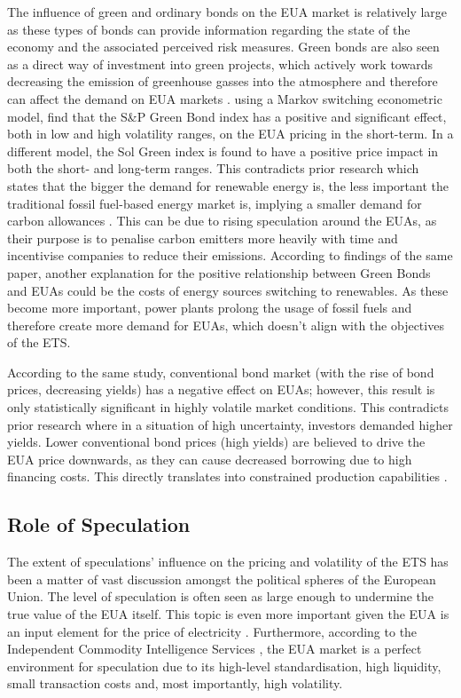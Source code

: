 \documentclass[12pt, letterpaper]{article}
\begin{document}
The influence of green and ordinary bonds on the EUA market is relatively large as these types of bonds can provide information regarding the state of the economy and the associated perceived risk measures. Green bonds are also seen as a direct way of investment into green projects, which actively work towards decreasing the emission of greenhouse gasses into the atmosphere and therefore can affect the demand on EUA markets \parencite{leitao2021}. \textcite{leitao2021} using a Markov switching econometric model, find that the S\&P Green Bond index has a positive and significant effect, both in low and high volatility ranges, on the EUA pricing in the short-term. In a different model, the Sol Green index is found to have a positive price impact in both the short- and long-term ranges. This contradicts prior research which states that the bigger the demand for renewable energy is, the less important the traditional fossil fuel-based energy market is, implying a smaller demand for carbon allowances \parencite{koch2014, leitao2021}. This can be due to rising speculation around the EUAs, as their purpose is to penalise carbon emitters more heavily with time and incentivise companies to reduce their emissions. According to findings of the same paper, another explanation for the positive relationship between Green Bonds and EUAs could be the costs of energy sources switching to renewables. As these become more important, power plants prolong the usage of fossil fuels and therefore create more demand for EUAs, which doesn’t align with the objectives of the ETS.

According to the same study, conventional bond market (with the rise of bond prices, decreasing yields) has a negative effect on EUAs; however, this result is only statistically significant in highly volatile market conditions. This contradicts prior research where in a situation of high uncertainty, investors demanded higher yields. Lower conventional bond prices (high yields) are believed to drive the EUA price downwards, as they can cause decreased borrowing due to high financing costs. This directly translates into constrained production capabilities \parencite{tan2017}.

\subsection{Role of Speculation}

The extent of speculations’ influence on the pricing and volatility of the ETS has been a matter of vast discussion amongst the political spheres of the European Union. The level of speculation is often seen as large enough to undermine the true value of the EUA itself. This topic is even more important given the EUA is an input element for the price of electricity \parencite{lovcha2021}. Furthermore, according to the Independent Commodity Intelligence Services \parencite{icis2020}, the EUA market is a perfect environment for speculation due to its high-level standardisation, high liquidity, small transaction costs and, most importantly, high volatility.
\end{document}
